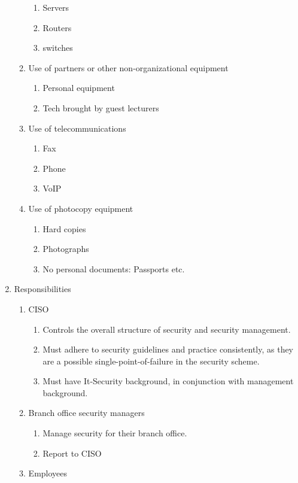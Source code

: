 \begin{enumerate}
\begin{enumerate}
\begin{enumerate}
      \item Servers
      \item Routers
      \item switches
    \end{enumerate}
    \item Use of partners or other non-organizational equipment
    \begin{enumerate}
      \item Personal equipment
      \item Tech brought by guest lecturers
    \end{enumerate}
    \item Use of telecommunications
    \begin{enumerate}
      \item Fax
      \item Phone
      \item VoIP
    \end{enumerate}
    \item Use of photocopy equipment
    \begin{enumerate}
      \item Hard copies
      \item Photographs 
      \item No personal documents: Passports etc.
    \end{enumerate}
  \end{enumerate}
  \item Responsibilities
  \begin{enumerate}
    \item CISO 
    \begin{enumerate}
      \item Controls the overall structure of security and security management.
      \item Must adhere to security guidelines and practice consistently, as they are a possible single-point-of-failure in the security scheme.
      \item Must have It-Security background, in conjunction with management background.
    \end{enumerate}
    \item Branch office security managers
    \begin{enumerate}
       \item Manage security for their branch office.
       \item Report to CISO
    \end{enumerate}
    \item Employees

\end{enumerate}
\end{enumerate}
